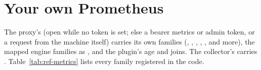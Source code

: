 \section{Your own Prometheus}

The proxy's  (open while no token is set; else a bearer metrics or admin token, or a request from the machine itself) carries its own families (, , , , ,  and more), the mapped engine families as , and the plugin's age and joins. The collector's  carries . Table~\ref{tab:ref-metrics} lists every family registered in the code.
